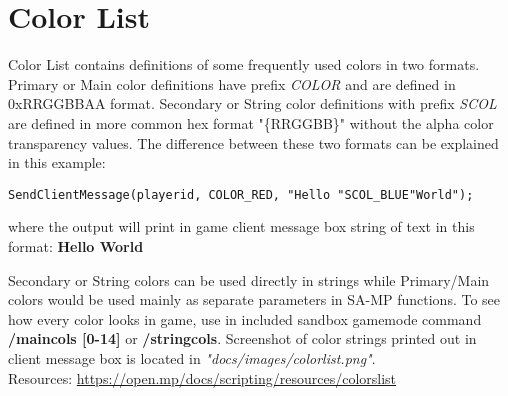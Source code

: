 \documentclass{article}
\begin{document}
\section{Color List}
Color List contains definitions of some frequently used colors in two formats. Primary or Main color definitions have prefix \textit{COLOR} and are defined in 0xRRGGBBAA format. Secondary or String color definitions with prefix \textit{SCOL} are defined in more common hex format "\{RRGGBB\}" without the alpha color transparency values. The difference between these two formats can be explained in this example:
\begin{verbatim}
SendClientMessage(playerid, COLOR_RED, "Hello "SCOL_BLUE"World");
\end{verbatim}
\begin{sloppypar}
\noindent where the output will print in game client message box string of text in this format:
\textbf{\color{red}Hello \color{blue}World}
\end{sloppypar}
\bigskip
Secondary or String colors can be used directly in strings while Primary/Main colors would be used mainly as separate parameters in SA-MP functions. To see how every color looks in game, use in included sandbox gamemode command \textbf{/maincols [0-14]} or \textbf{/stringcols}. Screenshot of color strings printed out in client message box is located in \textit{"docs/images/colorlist.png"}.
\bigskip
\\Resources: \url{https://open.mp/docs/scripting/resources/colorslist}


\newpage
\end{document}
